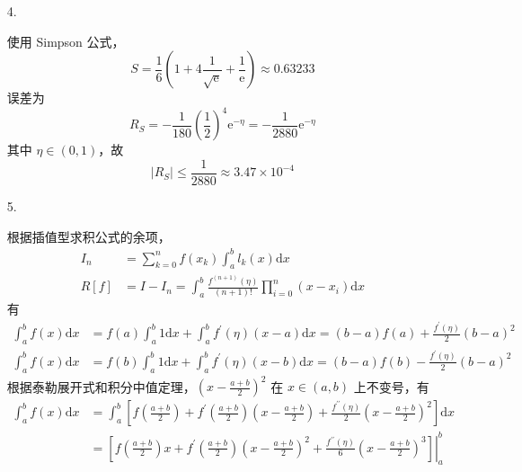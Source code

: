 \documentclass{sjtuarticle}
\def\dd{\mathrm{d}}
\def\ee{\mathrm{e}}
\begin{document}
\begin{itemize}
\begin{solution}
\begin{itemize}
\begin{equation*}
            \end{equation*}
        \end{itemize}
    \end{solution}
    \item[4.] \begin{solution}
        使用 Simpson 公式，
        \begin{equation*}
            S = \frac{1}{6}(1+4\frac{1}{\sqrt{\ee}}+\frac{1}{\ee})\approx 0.63233
        \end{equation*}
        误差为
        \begin{equation*}
            R_S = -\frac{1}{180}(\frac{1}{2})^4\ee^{-\eta}=-\frac{1}{2880}\ee^{-\eta}
        \end{equation*}
        其中 $\eta\in(0,1)$，故
        \begin{equation*}
            |R_S|\leq \frac{1}{2880} \approx 3.47 \times 10^{-4}
        \end{equation*}
    \end{solution}
    \item[5.] \begin{solution}
        根据插值型求积公式的余项，
        \begin{align*}
            I_n &= \sum_{k=0}^n f(x_k) \int_a^b l_k(x)\dd x\\
            R[f]&=I-I_n=\int_{a}^b \frac{f^{(n+1)}(\eta)}{(n+1)!}\prod_{i=0}^n (x-x_i)\dd x
        \end{align*}
        有
        \begin{align*}
            \int_a^b f(x)\dd x&=f(a)\int_a^b 1\dd x+\int_a^b f^\prime(\eta)(x-a)\dd x=(b-a)f(a)+\frac{f^\prime(\eta)}{2}(b-a)^2\\
            \int_a^b f(x)\dd x&=f(b)\int_a^b 1\dd x+\int_a^b f^\prime(\eta)(x-b)\dd x=(b-a)f(b)-\frac{f^\prime(\eta)}{2}(b-a)^2
        \end{align*}
        根据泰勒展开式和积分中值定理，$(x-\frac{a+b}{2})^2$ 在 $x\in(a,b)$ 上不变号，有
        \begin{align*}
            \int_a^b f(x)\dd x&=\int_a^b \left[f\left(\frac{a+b}{2}\right)+f^\prime\left(\frac{a+b}{2}\right)\left(x-\frac{a+b}{2}\right)+\frac{f^{\prime\prime}(\eta)}{2}\left(x-\frac{a+b}{2}\right)^2\right]\dd x\\
            &=\left.\left[f\left(\frac{a+b}{2}\right)x+f^\prime\left(\frac{a+b}{2}\right)\left(x-\frac{a+b}{2}\right)^2+\frac{f^{\prime\prime}(\eta)}{6}\left(x-\frac{a+b}{2}\right)^3\right]\right|_a^b\\

\end{align*}
\end{solution}
\end{itemize}
\end{document}
